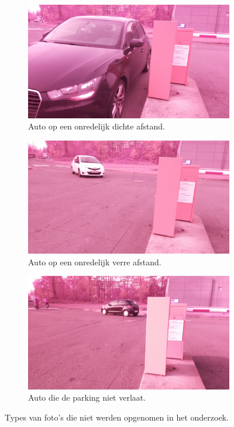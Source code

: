 \begin{figure}[h!]
	\centering
	\begin{subfigure}[b]{0.45\linewidth}
		\includegraphics[width=\linewidth]{img/slecht/close.jpg}
		\caption{Auto op een onredelijk dichte afstand.}
	\end{subfigure}
	\begin{subfigure}[b]{0.45\linewidth}
		\includegraphics[width=\linewidth]{img/slecht/far.jpg}
		\caption{Auto op een onredelijk verre afstand.}
	\end{subfigure}
	\begin{subfigure}[b]{0.45\linewidth}
		\includegraphics[width=\linewidth]{img/slecht/anderekant.jpg}
		\caption{Auto die de parking niet verlaat.}
	\end{subfigure}
	\caption{Types van foto's die niet werden opgenomen in het onderzoek.}
	\label{fig:badpics}
\end{figure}


